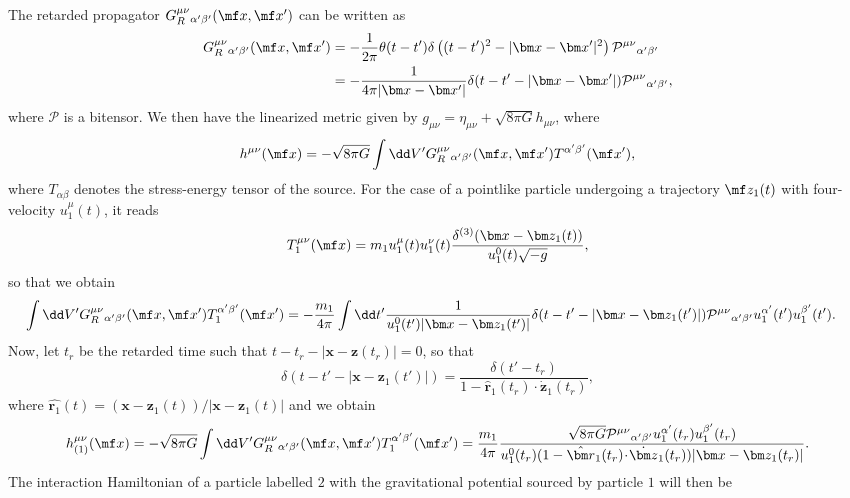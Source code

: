 {The retarded propagator $G_R^{\mu\nu}{}_{\alpha'\beta'}(\mf x,\mf x')$ can be written as
\begin{align}
    G_R^{\mu\nu}{}_{\alpha'\beta'}(\mf x,\mf x') &= -\frac{1}{2\pi}\theta(t-t') \delta\left((t-t')^2 - |\bm x - \bm x'|^2\right)\mathcal{P}^{\mu\nu}{}_{\alpha'\beta'} \\
    &= -\frac{1}{4\pi | \bm x - \bm x'|} \delta(t-t' - |\bm x  - \bm x'|)\mathcal{P}^{\mu\nu}{}_{\alpha'\beta'},
\end{align}
where $\mathcal{P}$ is a bitensor. We then have the linearized metric given by $g_{\mu\nu} = \eta_{\mu\nu} + \sqrt{8\pi G}h_{\mu\nu}$, where
\begin{equation}
    h^{\mu\nu}(\mf x) = -\sqrt{8 \pi G}\int \dd V' G_R^{\mu\nu}{}_{\alpha' \beta'}(\mf x,\mf x') T^{\alpha' \beta'}(\mf x'),
\end{equation}
where $T_{\alpha\beta}$ denotes the stress-energy tensor of the source. For the case of a pointlike particle undergoing a trajectory $\mf z_1(t)$  with four-velocity $u_1^\mu(t)$, it reads
\begin{equation}
    T_1^{\mu\nu}(\mf x) = m_1 u_1^\mu(t) u_1^\nu(t) \frac{\delta^{(3)}(\bm x - \bm z_1(t))}{u_1^0(t) \sqrt{-g}},
\end{equation}
so that we obtain{\footnotesize
\begin{align}
    \int \dd V' G_R^{\mu\nu}{}_{\alpha'\beta'}(\mf x,\mf x')T_1^{\alpha' \beta'}(\mf x') & = -\frac{m_1}{4\pi} \int \dd t'  \frac{1}{u_1^0(t') |\bm x - \bm z_1(t')|} \delta(t-t' - |\bm x  - \bm z_1(t')|) \mathcal{P}^{\mu\nu}{}_{\alpha'\beta'}u_1^{\alpha'}(t') u_1^{\beta'}(t').
\end{align}}
Now, let $t_r$ be the retarded time such that $t - t_r - |\bm x - \bm z(t_r)| = 0$, so that
\begin{equation}
    \delta(t-t' - |\bm x  - \bm z_1(t')|) = \frac{\delta(t'-t_r)}{1- \hat{\bm r}_1(t_r)\!\cdot\! \dot{\bm z}_1(t_r)},
\end{equation}
where $\hat{\bm r_1}(t) = (\bm x  - \bm z_1(t))/|\bm x  - \bm z_1(t)|$ and we obtain
\begin{align}
    h_{(1)}^{\mu\nu}(\mf x) =- \sqrt{8 \pi G}\int \dd V' G_R^{\mu\nu}{}_{\alpha'\beta'}(\mf x,\mf x')T_1^{\alpha' \beta'}(\mf x') = \frac{ m_1}{4\pi}  \frac{\sqrt{8 \pi G}\mathcal{P}^{\mu\nu}{}_{\alpha'\beta'}u_1^{\alpha'}(t_r) u_1^{\beta'}(t_r)}{u_1^0(t_r)(1- \hat{\bm r}_1(t_r)\!\cdot\! \dot{\bm z}_1(t_r)) |\bm x - \bm z_1(t_r)|}.
\end{align}
The interaction Hamiltonian of a particle labelled $2$ with the gravitational potential sourced by particle $1$ will then be
}
